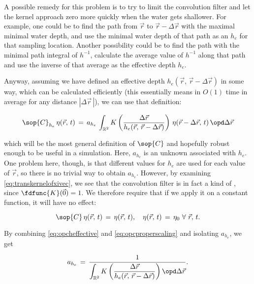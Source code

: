 A possible remedy for this problem is to try to limit the convolution filter and let the kernel approach zero more quickly when the water gets shallower. For example, one could be to find the path from $\vec{r}$ to $\vec{r}-\Delta\vec{r}$ with the maximal minimal water depth, and use the minimal water depth of that path as an  $h_e$ for that sampling location. Another possibility could be to find the path with the minimal path integral of $h^{-1}$, calculate the average value of $h^{-1}$ along that path and use the inverse of that average as the effective depth $h_e$.


Anyway, assuming we have defined an effective depth \mbox{$h_e(\vec{r},\,\vec{r}-\Delta\vec{r})$} in some way, which can be calculated efficiently (this essentially means in $O(1)$ time in average for any distance $|\Delta\vec{r}\,|$), we can use that definition:

\begin{equation} \label{eq:opcheffective}
\sop{C}_{h_e}\,\eta(\vec{r},\,t) \,=\, a_{h_e}\,\int_{\mathbb{R}^2}K\left(\frac{\Delta\vec{r}}{h_e(\vec{r},\,\vec{r}-\Delta\vec{r})}\right)\,\eta(\vec{r}-\Delta\vec{r},\,t)\,\opd\Delta\vec{r}
\end{equation}

which will be the most general definition of $\sop{C}$ and hopefully robust enough to be useful in a simulation. Here, $a_{h_e}$ is an unknown  associated with $h_e$. One problem here, though, is that different values for $h_e$ are used for each value of $\vec{r}$, so there is no trivial way to obtain $a_{h_e}$. However, by examining \eqref{eq:transkernelofxivec}, we see that the convolution filter is in fact a kind of , since $\fdfunc{K}(\vec{0}) = 1$. We therefore require that if we apply it on a constant function, it will have no effect:

\begin{equation} \label{eq:opcproperscaling}
\sop{C}\,\eta(\vec{r},\,t) \,=\, \eta(\vec{r},\,t),\quad\eta(\vec{r},\,t) \,=\, \eta_0\ \forall\ \vec{r},\,t.
\end{equation}

By combining \eqref{eq:opcheffective} and \eqref{eq:opcproperscaling} and isolating $a_{h_e}$, we get

\begin{equation} \label{eq:scalingheffective}
a_{h_e} \,=\, \frac{1}{\displaystyle\int_{\mathbb{R}^2}K\left(\frac{\Delta\vec{r}}{h_e(\vec{r},\,\vec{r}-\Delta\vec{r})}\right) \opd\Delta\vec{r}}.
\end{equation}

